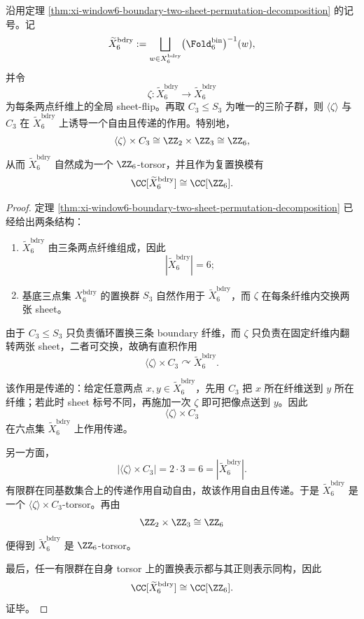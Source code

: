 \begin{theorem}\label{thm:xi-time-part53da-boundary-z6-torsor}
沿用定理 \ref{thm:xi-window6-boundary-two-sheet-permutation-decomposition} 的记号。记
\[
\widetilde X_6^{\mathrm{bdry}}
:=
\bigsqcup_{w\in X_6^{\mathrm{bdry}}}
\bigl(\Fold_6^{\mathrm{bin}}\bigr)^{-1}(w),
\]
并令
\[
\zeta:\widetilde X_6^{\mathrm{bdry}}\to \widetilde X_6^{\mathrm{bdry}}
\]
为每条两点纤维上的全局 sheet-flip。再取 \(C_3\le S_3\) 为唯一的三阶子群，则 \(\langle\zeta\rangle\) 与 \(C_3\) 在 \(\widetilde X_6^{\mathrm{bdry}}\) 上诱导一个自由且传递的作用。特别地，
\[
\langle\zeta\rangle\times C_3
\cong
\ZZ_2\times \ZZ_3
\cong
\ZZ_6,
\]
从而 \(\widetilde X_6^{\mathrm{bdry}}\) 自然成为一个 \(\ZZ_6\)-torsor，并且作为复置换模有
\[
\CC[\widetilde X_6^{\mathrm{bdry}}]\cong \CC[\ZZ_6].
\]
\end{theorem}
\begin{proof}
定理 \ref{thm:xi-window6-boundary-two-sheet-permutation-decomposition} 已经给出两条结构：
\begin{enumerate}
  \item \(\widetilde X_6^{\mathrm{bdry}}\) 由三条两点纤维组成，因此
  \[
  |\widetilde X_6^{\mathrm{bdry}}|=6;
  \]
  \item 基底三点集 \(X_6^{\mathrm{bdry}}\) 的置换群 \(S_3\) 自然作用于 \(\widetilde X_6^{\mathrm{bdry}}\)，而 \(\zeta\) 在每条纤维内交换两张 sheet。
\end{enumerate}
由于 \(C_3\le S_3\) 只负责循环置换三条 boundary 纤维，而 \(\zeta\) 只负责在固定纤维内翻转两张 sheet，二者可交换，故确有直积作用
\[
\langle\zeta\rangle\times C_3\curvearrowright \widetilde X_6^{\mathrm{bdry}}.
\]

该作用是传递的：给定任意两点 \(x,y\in \widetilde X_6^{\mathrm{bdry}}\)，先用 \(C_3\) 把 \(x\) 所在纤维送到 \(y\) 所在纤维；若此时 sheet 标号不同，再施加一次 \(\zeta\) 即可把像点送到 \(y\)。因此
\[
\langle\zeta\rangle\times C_3
\]
在六点集 \(\widetilde X_6^{\mathrm{bdry}}\) 上作用传递。

另一方面，
\[
\bigl|\langle\zeta\rangle\times C_3\bigr|=2\cdot 3=6=|\widetilde X_6^{\mathrm{bdry}}|.
\]
有限群在同基数集合上的传递作用自动自由，故该作用自由且传递。于是 \(\widetilde X_6^{\mathrm{bdry}}\) 是一个 \(\langle\zeta\rangle\times C_3\)-torsor。再由
\[
\ZZ_2\times\ZZ_3\cong \ZZ_6
\]
便得到 \(\widetilde X_6^{\mathrm{bdry}}\) 是 \(\ZZ_6\)-torsor。

最后，任一有限群在自身 torsor 上的置换表示都与其正则表示同构，因此
\[
\CC[\widetilde X_6^{\mathrm{bdry}}]\cong \CC[\ZZ_6].
\]
证毕。
\end{proof}

